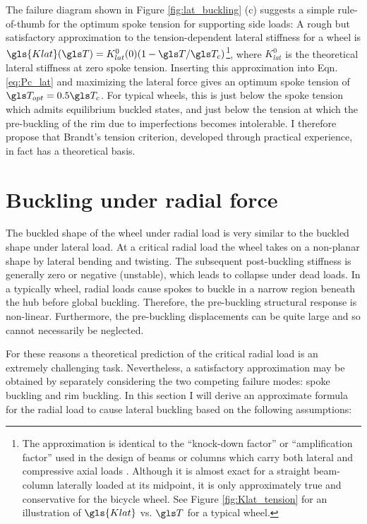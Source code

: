 \documentclass[\rootdir/thesis.tex]{subfiles}
\begin{document}
The failure diagram shown in Figure \ref{fig:lat_buckling} (c) suggests a simple rule-of-thumb for the optimum spoke tension for supporting side loads: A rough but satisfactory approximation to the tension-dependent lateral stiffness for a wheel is $\gls{Klat} (\T)=K_{lat}^0 (0)(1-\T/\T_c)$\footnote{The approximation is identical to the ``knock-down factor'' or ``amplification factor'' used in the design of beams or columns which carry both lateral and compressive axial loads \cite{Timoshenko1961}. Although it is almost exact for a straight beam-column laterally loaded at its midpoint, it is only approximately true and conservative for the bicycle wheel. See Figure \ref{fig:Klat_tension} for an illustration of $\gls{Klat}$ vs. $\T$ for a typical wheel.}, where $K_{lat}^0$ is the theoretical lateral stiffness at zero spoke tension. Inserting this approximation into Eqn. \eqref{eq:Pc_lat} and maximizing the lateral force gives an optimum spoke tension of $\T_{opt} = 0.5 \T_c$. For typical wheels, this is just below the spoke tension which admits equilibrium buckled states, and just below the tension at which the pre-buckling of the rim due to imperfections becomes intolerable. I therefore propose that Brandt's tension criterion, developed through practical experience, in fact has a theoretical basis.


\section{Buckling under radial force}

The buckled shape of the wheel under radial load is very similar to the buckled shape under lateral load. At a critical radial load the wheel takes on a non-planar shape by lateral bending and twisting. The subsequent post-buckling stiffness is generally zero or negative (unstable), which leads to collapse under dead loads. In a typically wheel, radial loads cause spokes to buckle in a narrow region beneath the hub before global buckling. Therefore, the pre-buckling structural response is non-linear. Furthermore, the pre-buckling displacements can be quite large and so cannot necessarily be neglected.

For these reasons a theoretical prediction of the critical radial load is an extremely challenging task. Nevertheless, a satisfactory approximation may be obtained by separately considering the two competing failure modes: spoke buckling and rim buckling. In this section I will derive an approximate formula for the radial load to cause lateral buckling based on the following assumptions:
\end{document}
